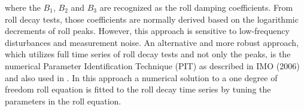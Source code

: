 




where the $B_1$, $B_2$ and $B_3$ are recognized as the roll damping coefficients.
From roll decay tests, those coefficients are normally derived based on the logarithmic decrements of roll peaks. However, this approach is sensitive to low-frequency disturbances and measurement noise. An alternative and more robust approach, which utilizes full time series of roll decay tests and not only the peaks, is the numerical Parameter Identification Technique (PIT) as described in IMO (2006) and also used in \parencite{bulian_simplified_2004}. In this approach a numerical solution to a one degree of freedom roll equation is fitted to the roll decay time series by tuning the parameters in the roll equation.


